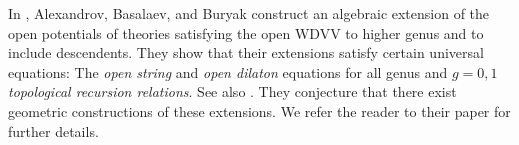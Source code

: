 \documentclass[11pt]{amsart}
\theoremstyle{definition}
\theoremstyle{remark}
\newcommand{\<}{\left<}
\renewcommand{\>}{\right>}
\numberwithin{equation}{section}
\begin{document}
In \cite{alexandrov2023construction}, Alexandrov, Basalaev, and Buryak construct an algebraic extension of %
the open potentials of theories satisfying the open WDVV to higher genus and to include descendents. They show that their extensions satisfy certain universal %
equations: The \emph{open string} %
and \emph{open dilaton} equations for %
all genus and %
$g=0,1$ \emph{topological recursion relations}. See also \cite{gomez2021open}.
They conjecture that there exist geometric constructions of these extensions. We refer the reader to their paper for further details.
\end{document}

